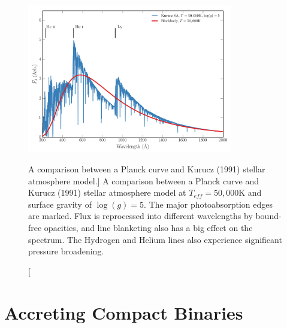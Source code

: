 \begin{figure}
\centering
\includegraphics[width=0.8\textwidth]{figures/01-intro/bb_v_sa.png}
\caption
[A comparison between a Planck curve and Kurucz (1991) stellar atmosphere model.]
{
A comparison between a Planck curve and Kurucz (1991) stellar atmosphere model
at $T_{eff}=50,000$K and surface gravity of $\log(g)=5$. The major photoabsorption
edges are marked. Flux is reprocessed into different wavelengths by bound-free opacities,
and line blanketing also has a big effect on the spectrum. The Hydrogen and Helium lines
also experience significant pressure broadening.
} 
\label{fig:bb_v_sa}
\end{figure}


\section{Accreting Compact Binaries}

